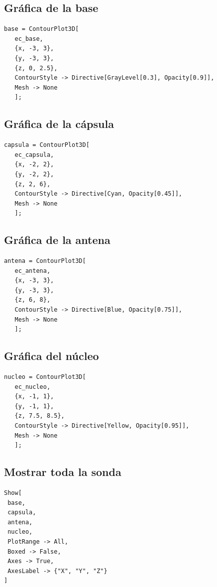 \documentclass[12pt,a4paper]{article}
\begin{document}
\subsection{Gráfica de la base}

\begin{lstlisting}
base = ContourPlot3D[
   ec_base,
   {x, -3, 3},
   {y, -3, 3},
   {z, 0, 2.5},
   ContourStyle -> Directive[GrayLevel[0.3], Opacity[0.9]],
   Mesh -> None
   ];
\end{lstlisting}

\subsection{Gráfica de la cápsula}

\begin{lstlisting}
capsula = ContourPlot3D[
   ec_capsula,
   {x, -2, 2},
   {y, -2, 2},
   {z, 2, 6},
   ContourStyle -> Directive[Cyan, Opacity[0.45]],
   Mesh -> None
   ];
\end{lstlisting}

\subsection{Gráfica de la antena}

\begin{lstlisting}
antena = ContourPlot3D[
   ec_antena,
   {x, -3, 3},
   {y, -3, 3},
   {z, 6, 8},
   ContourStyle -> Directive[Blue, Opacity[0.75]],
   Mesh -> None
   ];
\end{lstlisting}

\subsection{Gráfica del núcleo}

\begin{lstlisting}
nucleo = ContourPlot3D[
   ec_nucleo,
   {x, -1, 1},
   {y, -1, 1},
   {z, 7.5, 8.5},
   ContourStyle -> Directive[Yellow, Opacity[0.95]],
   Mesh -> None
   ];
\end{lstlisting}

\subsection{Mostrar toda la sonda}

\begin{lstlisting}
Show[
 base,
 capsula,
 antena,
 nucleo,
 PlotRange -> All,
 Boxed -> False,
 Axes -> True,
 AxesLabel -> {"X", "Y", "Z"}
]
\end{lstlisting}
\end{document}
